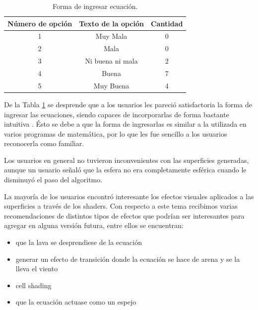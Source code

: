\documentclass[12pt]{article}
\begin{document}
\begin{table}[h!]
  \centering
  \begin{tabular}{ccc}
    \toprule
    Número de opción &  Texto de la opción &Cantidad\\
    \midrule
    1 & Muy Mala & 0 \\
    2 & Mala & 0 \\
    3 & Ni buena ni mala & 2 \\
    4 & Buena & 7\\
    5 & Muy Buena & 4\\
    \bottomrule
  \end{tabular}
  \caption{Forma de ingresar ecuación.}
  \label{enc2}
\end{table}

De la Tabla \ref{enc2} se desprende que a los usuarios les pareció satisfactoria la forma de ingresar las ecuaciones, siendo capaces de incorporarlas de forma bastante intuitiva . Ésto se debe a que la forma de ingresarlas es similar a la utilizada en varios programas de matemática, por lo que les fue sencillo a los usuarios reconocerla como familiar.

Los usuarios en general no tuvieron inconvenientes con las superficies generadas, aunque un usuario señaló que la esfera no era completamente esférica cuando le disminuyó el paso del algoritmo. 

La mayoría de los usuarios encontró interesante los efectos visuales aplicados a las superficies a través de los shaders. Con respecto a este tema recibimos varias recomendaciones de distintos tipos de efectos que podrían ser interesantes para agregar en alguna versión futura, entre ellos se encuentran: 
\begin{itemize}
\item que la lava se desprendiese de la ecuación
\item generar un efecto de transición donde la ecuación se hace de arena y se la lleva el viento
\item cell shading
\item que la ecuación actuase como un espejo
\end{itemize}
\end{document}
